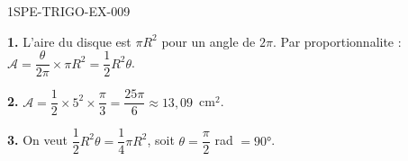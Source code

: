 \begin{corrige}{1SPE-TRIGO-EX-009}

\textbf{1.} L'aire du disque est $\pi R^2$ pour un angle de $2\pi$. Par proportionnalite :
$\mathcal{A} = \dfrac{\theta}{2\pi} \times \pi R^2 = \dfrac{1}{2}R^2\theta$.

\textbf{2.} $\mathcal{A} = \dfrac{1}{2} \times 5^2 \times \dfrac{\pi}{3} = \dfrac{25\pi}{6} \approx 13{,}09$~cm$^2$.

\textbf{3.} On veut $\dfrac{1}{2}R^2\theta = \dfrac{1}{4}\pi R^2$, soit $\theta = \dfrac{\pi}{2}$ rad $= 90°$.

\end{corrige}
